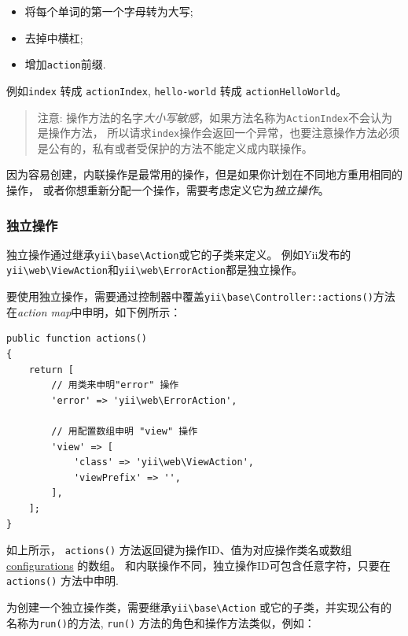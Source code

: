 \begin{itemize}
\item 将每个单词的第一个字母转为大写;
\item 去掉中横杠;
\item 增加\lstinline|action|前缀.
\end{itemize}
例如\lstinline|index| 转成 \lstinline|actionIndex|, \lstinline|hello-world| 转成 \lstinline|actionHelloWorld|。

\begin{quote}注意: 操作方法的名字\textit{大小写敏感}，如果方法名称为\lstinline|ActionIndex|不会认为是操作方法，
  所以请求\lstinline|index|操作会返回一个异常，也要注意操作方法必须是公有的，私有或者受保护的方法不能定义成内联操作。

\end{quote}
因为容易创建，内联操作是最常用的操作，但是如果你计划在不同地方重用相同的操作，
或者你想重新分配一个操作，需要考虑定义它为\textit{独立操作}。

\subsubsection{独立操作 \label{structure-controllers.md::standalone-actions}}
独立操作通过继承\texttt{yii{\allowbreak{}\textbackslash}base{\allowbreak{}\textbackslash}Action}或它的子类来定义。
例如Yii发布的\texttt{yii{\allowbreak{}\textbackslash}web{\allowbreak{}\textbackslash}ViewAction}和\texttt{yii{\allowbreak{}\textbackslash}web{\allowbreak{}\textbackslash}ErrorAction}都是独立操作。

要使用独立操作，需要通过控制器中覆盖\texttt{yii{\allowbreak{}\textbackslash}base{\allowbreak{}\textbackslash}Controller\allowbreak{}::\allowbreak{}actions()}方法在\textit{action map}中申明，如下例所示：

\lstset{language=php}\begin{lstlisting}
public function actions()
{
    return [
        // 用类来申明"error" 操作
        'error' => 'yii\web\ErrorAction',

        // 用配置数组申明 "view" 操作
        'view' => [
            'class' => 'yii\web\ViewAction',
            'viewPrefix' => '',
        ],
    ];
}
\end{lstlisting}
如上所示， \lstinline|actions()| 方法返回键为操作ID、值为对应操作类名或数组\hyperref[concept-configurations.md]{configurations} 的数组。
和内联操作不同，独立操作ID可包含任意字符，只要在\lstinline|actions()| 方法中申明.

为创建一个独立操作类，需要继承\texttt{yii{\allowbreak{}\textbackslash}base{\allowbreak{}\textbackslash}Action} 或它的子类，并实现公有的名称为\lstinline|run()|的方法,
\lstinline|run()| 方法的角色和操作方法类似，例如：

